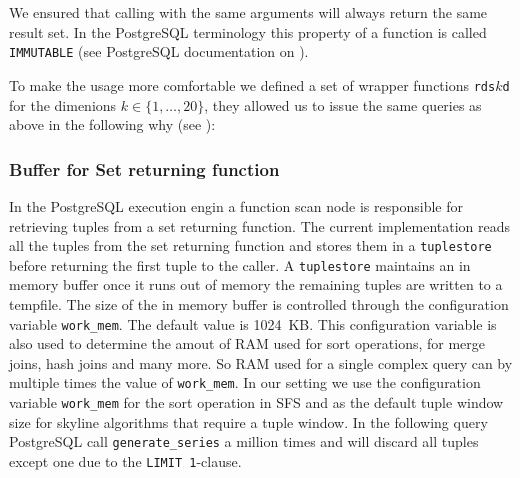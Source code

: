 We ensured that calling  with the same
arguments will always return the same result set. In the PostgreSQL
terminology this property of a function is called \texttt{IMMUTABLE}
(see PostgreSQL documentation on
).

To make the usage more comfortable we defined a set of wrapper
functions \texttt{rds$k$d} for the dimenions $k \in \{1, \ldots,
20\}$, they allowed us to issue the same queries as above in the
following why (see ):

\begin{interactive}


\end{interactive}


\subsubsection{Buffer for Set returning function}

In the PostgreSQL execution engin a function scan node is responsible
for retrieving tuples from a set returning function. The current
implementation reads all the tuples from the set returning function
and stores them in a \texttt{tuplestore} before returning the first
tuple to the caller. A \texttt{tuplestore} maintains an in memory
buffer once it runs out of memory the remaining tuples are written to
a tempfile. The size of the in memory buffer is controlled through the
configuration variable \texttt{work\_mem}. The default value is
1024~KB. This configuration variable is also used to determine the amout
of RAM used for sort operations, for merge joins, hash joins and many more.
So RAM used for a single complex query can by multiple times the value of 
\texttt{work\_mem}.
In our setting we use the configuration variable \texttt{work\_mem}
for the sort operation in SFS and as the default tuple window size for
skyline algorithms that require a tuple window. In the following query
PostgreSQL call \texttt{generate\_series} a million times and will
discard all tuples except one due to the
\texttt{LIMIT 1}-clause.


